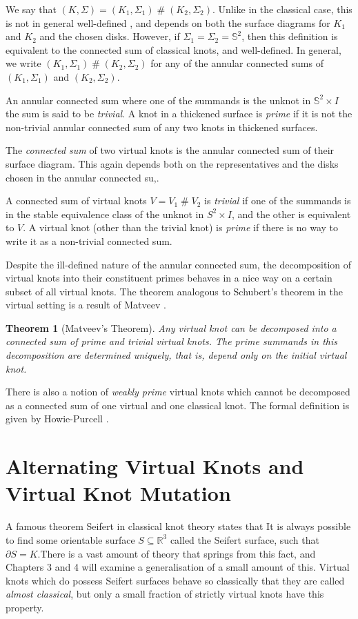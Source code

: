 \documentclass[12pt]{report}
\newcommand{\R}{\mathbb{R}}
\renewcommand{\S}{\mathbb{S}}
\newcommand{\hash}{\ensuremath{\mathbin{\#}}}
\newtheorem*{theorem}{Theorem}
\theoremstyle{upright}
\begin{document}
We say that $(K, \Sigma) = (K_{1}, \Sigma_{1}) \hash (K_{2}, \Sigma_{2})$. Unlike in the classical case, this is not in general well-defined \cite{virtual-knots-and-links}, and depends on both the surface diagrams for $K_{1}$ and $K_{2}$ and the chosen disks. However, if $\Sigma_{1} = \Sigma_{2} = \S^{2}$, then this definition is equivalent to the connected sum of classical knots, and well-defined. In general, we write $(K_{1}, \Sigma_{1}) \hash (K_{2}, \Sigma_{2})$ for any of the annular connected sums of $(K_{1}, \Sigma_{1})$ and $(K_{2}, \Sigma_{2})$.

An annular connected sum where one of the summands is the unknot in $\S^{2} \times I$ the sum is said to be \textit{trivial}. A knot in a thickened surface is \textit{prime} if it is not the non-trivial annular connected sum of any two knots in thickened surfaces.

The \textit{connected sum} of two virtual knots is the annular connected sum of their surface diagram. This again depends both on the representatives and the disks chosen in the annular connected su,.

A connected sum of virtual knots $V = V_{1} \hash V_{2}$ is \textit{trivial} if one of the summands is in the stable equivalence class of the unknot in $S^{2} \times I$, and the other is equivalent to $V$. A virtual knot (other than the trivial knot) is \textit{prime} if there is no way to write it as a non-trivial connected sum.

Despite the ill-defined nature of the annular connected sum, the decomposition of virtual knots into their constituent primes behaves in a nice way on a certain subset of all virtual knots. The theorem analogous to Schubert's theorem in the virtual setting is a result of Matveev \cite[Theorem 13]{roots-and-decompositions}.

\begin{theorem}[Matveev's Theorem]
Any virtual knot can be decomposed into a connected sum of prime and trivial virtual knots. The prime summands in this decomposition are determined uniquely, that is, depend only on the initial virtual knot.
\end{theorem}

There is also a notion of \textit{weakly prime} virtual knots which cannot be decomposed as a connected sum of one virtual and one classical knot. The formal definition is given by Howie-Purcell \cite{geometry-of-alternating-links-on-surfaces}.


\section{Alternating Virtual Knots and Virtual Knot Mutation}
A famous theorem Seifert in classical knot theory states that It is always possible to find some orientable surface $S \subseteq \R^{3}$ called the Seifert surface, such that $\partial S = K$.There is a vast amount of theory that springs from this fact, and Chapters 3 and 4 will examine a generalisation of a small amount of this. Virtual knots which do possess Seifert surfaces behave so classically that they are called \textit{almost classical}, but only a small fraction of strictly virtual knots have this property.
\end{document}
